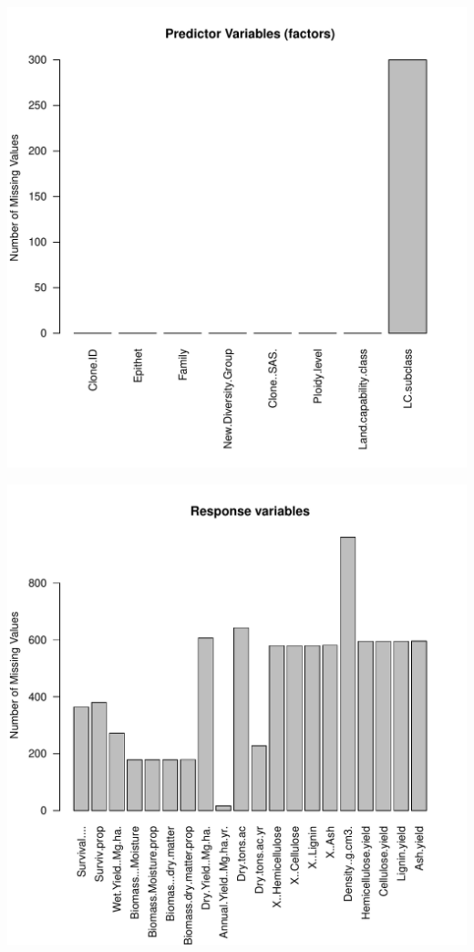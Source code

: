 \documentclass{article}\usepackage[]{graphicx}\usepackage[]{color}
\makeatletter
\def\maxwidth{ %
  \ifdim\Gin@nat@width>\linewidth
    \linewidth
  \else
    \Gin@nat@width
  \fi
}
\newenvironment{knitrout}{}{} %
\makeatother
\begin{document}
\begin{knitrout}
{}




{\centering \includegraphics[width=\maxwidth]{figure/MissingValuesPredictorGroup-3} 

}




{\centering \includegraphics[width=\maxwidth]{figure/MissingValuesPredictorGroup-4} 

}



\end{knitrout}
\end{document}
